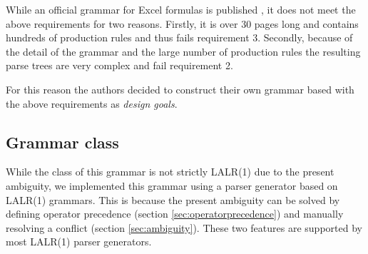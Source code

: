 \documentclass[conference]{IEEEtran}
\begin{document}
While an official grammar for Excel formulas is published \cite{ExcelOfficialGrammar}, it does not meet the above requirements for two reasons.
Firstly, it is over 30 pages long and contains hundreds of production rules and thus fails requirement 3.
Secondly, because of the detail of the grammar and the large number of production rules the resulting parse trees are very complex and fail requirement 2.

For this reason the authors decided to construct their own grammar based with the above requirements as \emph{design goals}.

\subsection{Grammar class}

While the class of this grammar is not strictly LALR(1) due to the present ambiguity, we implemented this grammar using a parser generator based on LALR(1) grammars.
This is because the present ambiguity can be solved by defining operator precedence (section \ref{sec:operatorprecedence}) and manually resolving a conflict (section \ref{sec:ambiguity}).
These two features are supported by most LALR(1) parser generators.
\end{document}
